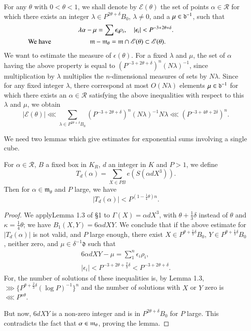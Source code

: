 For any $\theta$ with $0 < \theta < 1$, we shall denote by $\mathscr{E}(\theta)$ the set of points $\alpha \in \mathscr{R}$ for which there exists an integer $\lambda \in P^{2 \theta + \delta} B_0$, $\lambda \neq 0$, and a $\mu \in \mathfrak{d}^{-1}$, such that
\begin{gather*}
\lambda \alpha - \mu = \sum \epsilon_i \rho_i, \quad |\epsilon_i| < P^{-3+2\theta + \delta}.\\
\text{We have} \hspace{2cm} \fm - \fm_\theta = \fm \cap \mathscr{E} (\theta) \subset \mathscr{E} (\theta). \hspace{3cm}
\end{gather*}
We want to estimate the measure of $\epsilon(\theta)$. For a fixed $\lambda$ and $\mu$, the set of $\alpha$ having the above property is equal to $(P^{-3+2\theta + \delta})^n (N\lambda)^{-1}$, since multiplication by $\lambda$ multiplies the $n$-dimensional measures of sets by $N\lambda$. Since for any fixed integer $\lambda$, there correspond at most $O(N\lambda)$ elements $\mu \in \mathfrak{d}^{-1}$ for which there exists an $\alpha \in \mathscr{R}$ satisfying the above inequalities with respect to this $\lambda$ and $\mu$, we obtain
$$
|\mathscr{E} (\theta)|\lll \sum\limits_{\lambda \in P^{2\theta + \delta} B_0} (P^{-3+2 \theta + \delta})^n (N\lambda)^{-1} N \lambda \lll (P^{-3 + 4 \theta + 2 \delta})^n.
$$

We need two lemmas which give estimates for exponential sums involving a single cube.

\begin{lemma}%
For $\alpha \in \mathscr{R}$, $B$ a fixed box in $K_R$, $d$ an integer in $K$ and $P>1$, we define
$$
T_d (\alpha) = \sum\limits_{X \in PB} e(S(\alpha d X^3)).
$$
Then for $\alpha \in \mathfrak{m_\theta}$ and $P$ large, we have 
$$
|T_d(\alpha)| < P^{(1-\frac{1}{4}\theta)n}.
$$
\end{lemma}

\begin{proof}
We apply\pageoriginale Lemma 1.3 of \S 1 to $\Gamma (X) = \alpha d X^3$, with $\theta + \frac{1}{3} \delta$ instead of $\theta$ and $\kappa = \frac{1}{4} \theta$; we have $B_1 (X,Y) = 6 \alpha d X Y$. We conclude that if the above estimate for $|T_d(\alpha)|$ is not valid, and $P$ large enough, there exist $X \in P^{\theta + \frac{1}{3} \delta} B_0$, $Y \in P^{\theta + \frac{1}{3} \delta} B_0$, neither zero, and $\mu \in \delta^{-1}\mathfrak{d}$ such that 
\begin{gather*}
6 \alpha d X Y - \mu = \sum\limits^n_1 \epsilon_i \rho_i,\\
|\epsilon_i| < P^{-3 + 2\theta + \frac{2}{3}\delta} < P^{-3 + 2 \theta + \delta}.
\end{gather*}
For, the number of solutions of these inequalities is, by Lemma 1.3, $\ggg \{P^{\theta + \frac{2}{3}\delta} (\log P)^{-1}\}^n$ and the number of solutions with $X$ or $Y$ zero is $\lll P^{n\theta}$.

But now, $6d XY$ is a non-zero integer and is in $P^{2\theta+ \delta} B_0$ for $P$ large. This contradicts the fact that $\alpha \in \mathfrak{m}_\theta$, proving the lemma.

\end{proof}

